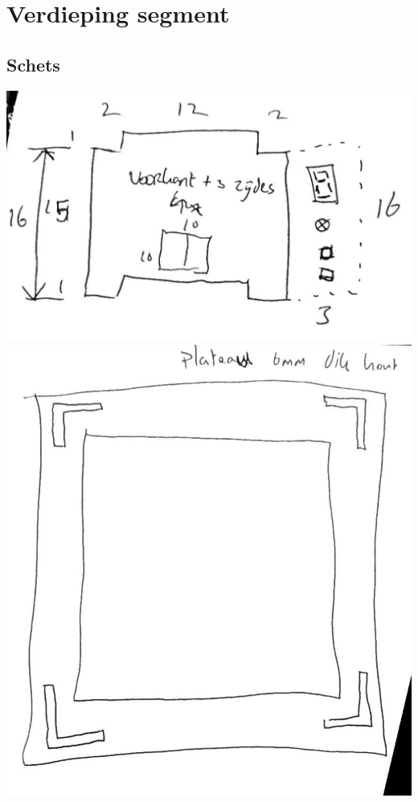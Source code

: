 \section{Verdieping segment}

\subsection{Schets}
\begin{center}
\includegraphics[height=0.45\textheight, angle = 0]{src/schets/verdieping.pdf}
\includegraphics[height=0.45\textheight, angle = 0]{src/schets/tussenplateau.pdf}
\end{center}

